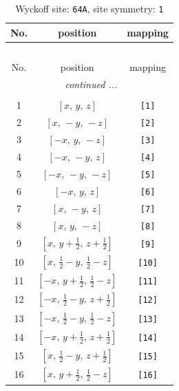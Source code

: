 \documentclass[fleqn,8pt]{jsarticle}
\begin{document}
\begin{longtable}{ccc}
\caption{Wyckoff site: {\tt 64A}, site symmetry: {\tt 1}}
 \\
 \hline \hline
No. & position & mapping \\ \hline \endfirsthead

\multicolumn{2}{l}{\tablename\ \thetable{}} \\
 \hline \hline
No. & position & mapping \\ \hline \endhead

 \hline \hline
\multicolumn{2}{r}{\footnotesize\it continued ...} \\ \endfoot

 \hline \hline
\multicolumn{2}{r}{} \\ \endlastfoot

1 & $\left[ x,\, y,\, z \right]$ & {\tt [1]} \\ \hline
2 & $\left[ x,\, - y,\, - z \right]$ & {\tt [2]} \\ \hline
3 & $\left[ - x,\, y,\, - z \right]$ & {\tt [3]} \\ \hline
4 & $\left[ - x,\, - y,\, z \right]$ & {\tt [4]} \\ \hline
5 & $\left[ - x,\, - y,\, - z \right]$ & {\tt [5]} \\ \hline
6 & $\left[ - x,\, y,\, z \right]$ & {\tt [6]} \\ \hline
7 & $\left[ x,\, - y,\, z \right]$ & {\tt [7]} \\ \hline
8 & $\left[ x,\, y,\, - z \right]$ & {\tt [8]} \\ \hline
9 & $\left[ x,\, y + \frac{1}{2},\, z + \frac{1}{2} \right]$ & {\tt [9]} \\ \hline
10 & $\left[ x,\, \frac{1}{2} - y,\, \frac{1}{2} - z \right]$ & {\tt [10]} \\ \hline
11 & $\left[ - x,\, y + \frac{1}{2},\, \frac{1}{2} - z \right]$ & {\tt [11]} \\ \hline
12 & $\left[ - x,\, \frac{1}{2} - y,\, z + \frac{1}{2} \right]$ & {\tt [12]} \\ \hline
13 & $\left[ - x,\, \frac{1}{2} - y,\, \frac{1}{2} - z \right]$ & {\tt [13]} \\ \hline
14 & $\left[ - x,\, y + \frac{1}{2},\, z + \frac{1}{2} \right]$ & {\tt [14]} \\ \hline
15 & $\left[ x,\, \frac{1}{2} - y,\, z + \frac{1}{2} \right]$ & {\tt [15]} \\ \hline
16 & $\left[ x,\, y + \frac{1}{2},\, \frac{1}{2} - z \right]$ & {\tt [16]} \\ \hline

\end{longtable}
\end{document}
